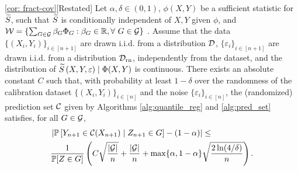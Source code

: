 \begin{customcor}{\ref*{cor: fract-cov}}[Restated]
Let $\alpha, \delta \in (0,1)$, $\phi(X,Y)$ be a sufficient statistic for ${\widetilde{S}}$, such that ${\widetilde{S}}$ is conditionally independent of $X,Y$ given $\phi$, and
    $
        {\cal W} = \{\sum_{G \in {\cal G}} \beta_G \Phi_G: \beta_G \in \mathbb{R}, \forall~G\in{\cal G}\}
    $
    . Assume that the data $\{(X_i,Y_i)\}_{i\in [n+1]}$ are drawn \mbox{i.i.d.} from a distribution ${\cal D}$, $\{\varepsilon_i\}_{i\in [n+1]}$ are drawn \mbox{i.i.d.} from a distribution ${\cal D}_{\text{rn}}$, independently from the dataset, and the distribution of ${\widetilde{S}}\left(X,Y, \varepsilon\right) \mid \Phi(X,Y)$ is continuous. There exists an absolute constant $C$ such that, with probability at least $1-\delta$ over the randomness of the calibration dataset $\{(X_i,Y_i)\}_{i\in [n]}$ and the noise $\{\varepsilon_i\}_{i \in [n]}$, the (randomized) prediction set ${\cal C}$ given by Algorithms \ref{alg:quantile_reg} and \ref{alg:pred_set} satisfies, for all $G \in {\cal G}$,
    \begin{align*}
    &\left|\mathbb{P}\left[ Y_{n+1} \in{\cal C}(X_{n+1}) \mid Z_{n+1}\in G  \right] -(1-\alpha)\right| \leq \\
    &\frac{1}{\mathbb{P}[Z\in G]} 
     \left( C\sqrt{\frac{|{\cal G}|}{n}}+\frac{|{\cal G}|}{n}+\max \{\alpha, 1-\alpha\}\sqrt{\frac{2\ln(4/\delta)}{n}}  \right).
     \end{align*}
\end{customcor}
